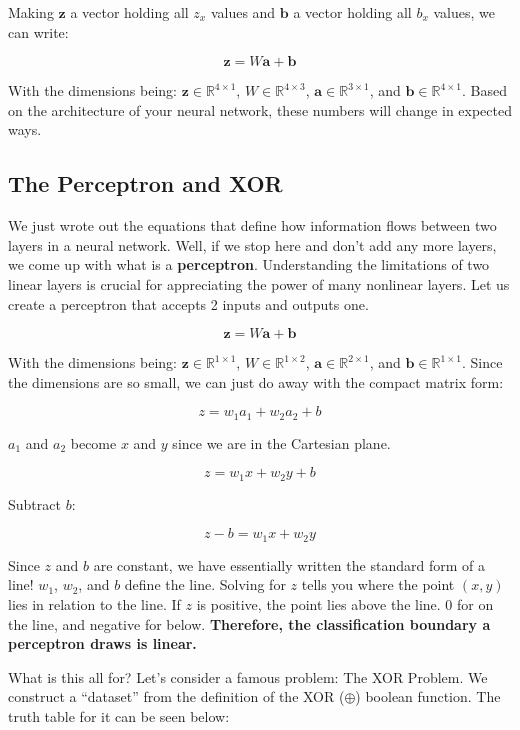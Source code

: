 \begin{flushleft}
    Making $\textbf{z}$ a vector holding all $z_x$ values and $\textbf{b}$ a vector holding all $b_x$ values, we can write:

    $$\textbf{z} = W\textbf{a} + \textbf{b}$$

    With the dimensions being: $\textbf{z} \in \mathbb{R}^{4 \times 1}$, $W \in \mathbb{R}^{4 \times 3}$, $\textbf{a} \in \mathbb{R}^{3 \times 1}$, and $\textbf{b} \in \mathbb{R}^{4 \times 1}$. Based on the architecture of your neural network, these numbers will change in expected ways.
\end{flushleft}

\subsection{The Perceptron and XOR}
\begin{flushleft}
    \large We just wrote out the equations that define how information flows between two layers in a neural network. Well, if we stop here and don't add any more layers, we come up with what is a \textbf{perceptron}. Understanding the limitations of two linear layers is crucial for appreciating the power of many nonlinear layers. Let us create a perceptron that accepts 2 inputs and outputs one.

    $$\textbf{z} = W\textbf{a} + \textbf{b}$$

    With the dimensions being: $\textbf{z} \in \mathbb{R}^{1 \times 1}$, $W \in \mathbb{R}^{1 \times 2}$, $\textbf{a} \in \mathbb{R}^{2 \times 1}$, and $\textbf{b} \in \mathbb{R}^{1 \times 1}$. Since the dimensions are so small, we can just do away with the compact matrix form:

    $$z = w_1a_1 + w_2a_2 + b$$

    $a_1$ and $a_2$ become $x$ and $y$ since we are in the Cartesian plane.

    $$z = w_1x + w_2y + b$$

    Subtract $b$:

    $$z - b = w_1x + w_2y$$

    Since $z$ and $b$ are constant, we have essentially written the standard form of a line! $w_1$, $w_2$, and $b$ define the line. Solving for $z$ tells you where the point $(x, y)$ lies in relation to the line. If $z$ is positive, the point lies above the line. 0 for on the line, and negative for below. \textbf{Therefore, the classification boundary a perceptron draws is linear.}

    What is this all for? Let's consider a famous problem: The XOR Problem. We construct a ``dataset'' from the definition of the XOR ($\oplus$) boolean function. The truth table for it can be seen below:


\end{flushleft}
